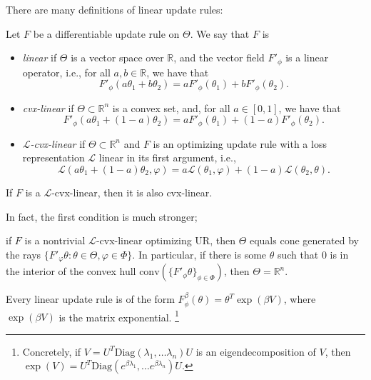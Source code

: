 \documentclass{article}
\begin{document}
There are many definitions of linear update rules:
\begin{defn}\label{ax:linear}
Let $F$ be a differentiable update rule on $\Theta$. We say that $F$ is \textellipsis
\begin{itemize}
    \item \emph{linear} if $\Theta$ is a vector space over $\mathbb R$, and the
    vector field $F'_\phi$ is a linear operator, i.e., for all $a, b \in \mathbb R$, we have that
    \[ F'_\phi(a \theta_1 + b \theta_2) = a F'_\phi(\theta_1) + b F'_\phi(\theta_2). \]

    \item \emph{cvx-linear} if $\Theta \subset \mathbb R^n$ is a convex set, and, for all $a \in [0,1]$, we have that
    \[ F'_\phi(a \theta_1 + (1-a) \theta_2) = a F'_\phi(\theta_1) + (1-a) F'_\phi(\theta_2). \]
    
    \item \emph{$\mathcal L$-cvx-linear} if $\Theta \subset \mathbb R^n$ and $F$ is an optimizing update rule with a loss representation $\mathcal L$ linear in its first argument, i.e.,
    \[ 
        \mathcal L(a \theta_1 + (1-a) \theta_2, \varphi) = a \mathcal L(\theta_1, \varphi) + (1-a) \mathcal L(\theta_2, \theta). 
    \] 
\end{itemize}
\end{defn}

\begin{prop}
    If $F$ is a $\mathcal L$-cvx-linear, then it is also cvx-linear.
\end{prop}

In fact, the first condition is much stronger;
\begin{prop}
    if $F$ is a nontrivial $\mathcal L$-cvx-linear optimizing UR, then $\Theta$ equals cone generated by  the rays $\{ F'_\varphi\theta : \theta \in \Theta, \varphi \in \Phi \}$. In particular, if there is some $\theta$ such that $0$ is in the interior of the convex hull $\mathrm{conv}(\{F'_\phi\theta\}_{\phi \in \Phi})$, then $\Theta = \mathbb R^n$.
\end{prop}


\begin{prop}
    Every linear update rule is of the form
    $
        F^{\beta}_\phi(\theta) =  \theta^{T} \exp(\beta V)
    $,
    where $\exp(\beta V)$ is the matrix exponential.%
        \footnote{Concretely, if $V = U^T \mathrm{Diag}(\lambda_1, \ldots \lambda_n) U$ is an eigendecomposition of $V$, then $\exp(V) = U^T \mathrm{Diag}(e^{\beta\lambda_1}, \ldots e^{\beta\lambda_n}) U$.}
\end{prop}
\end{document}

